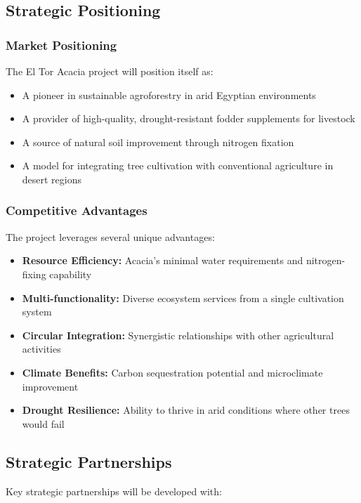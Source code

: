 \subsection{Strategic Positioning}

\subsubsection{Market Positioning}
The El Tor Acacia project will position itself as:

\begin{itemize}
    \item A pioneer in sustainable agroforestry in arid Egyptian environments
    \item A provider of high-quality, drought-resistant fodder supplements for livestock
    \item A source of natural soil improvement through nitrogen fixation
    \item A model for integrating tree cultivation with conventional agriculture in desert regions
\end{itemize}

\subsubsection{Competitive Advantages}
The project leverages several unique advantages:

\begin{itemize}
    \item \textbf{Resource Efficiency:} Acacia's minimal water requirements and nitrogen-fixing capability
    \item \textbf{Multi-functionality:} Diverse ecosystem services from a single cultivation system
    \item \textbf{Circular Integration:} Synergistic relationships with other agricultural activities
    \item \textbf{Climate Benefits:} Carbon sequestration potential and microclimate improvement
    \item \textbf{Drought Resilience:} Ability to thrive in arid conditions where other trees would fail
\end{itemize}

\subsection{Strategic Partnerships}

Key strategic partnerships will be developed with:

